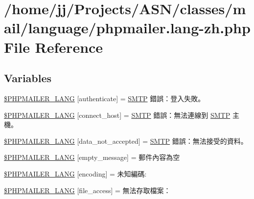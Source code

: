 \hypertarget{phpmailer_8lang-zh_8php}{}\section{/home/jj/\+Projects/\+A\+S\+N/classes/mail/language/phpmailer.lang-\/zh.php File Reference}
\label{phpmailer_8lang-zh_8php}
\subsection*{Variables}
\begin{DoxyCompactItemize}
\item 
\hyperlink{phpmailer_8lang-zh_8php_a2cb33073c989b85580748e331ed8b4aa}{\$\+P\+H\+P\+M\+A\+I\+L\+E\+R\+\_\+\+L\+A\+NG} \mbox{[}\textquotesingle{}authenticate\textquotesingle{}\mbox{]} = \textquotesingle{}\hyperlink{class_s_m_t_p}{S\+M\+TP} 錯誤：登入失敗。\textquotesingle{}
\item 
\hyperlink{phpmailer_8lang-zh_8php_a2ee0cc637a06b96e45600db31c6799ee}{\$\+P\+H\+P\+M\+A\+I\+L\+E\+R\+\_\+\+L\+A\+NG} \mbox{[}\textquotesingle{}connect\+\_\+host\textquotesingle{}\mbox{]} = \textquotesingle{}\hyperlink{class_s_m_t_p}{S\+M\+TP} 錯誤：無法連線到 \hyperlink{class_s_m_t_p}{S\+M\+TP} 主機。\textquotesingle{}
\item 
\hyperlink{phpmailer_8lang-zh_8php_a814c6b191205d2361b3233e9c9d6fda5}{\$\+P\+H\+P\+M\+A\+I\+L\+E\+R\+\_\+\+L\+A\+NG} \mbox{[}\textquotesingle{}data\+\_\+not\+\_\+accepted\textquotesingle{}\mbox{]} = \textquotesingle{}\hyperlink{class_s_m_t_p}{S\+M\+TP} 錯誤：無法接受的資料。\textquotesingle{}
\item 
\hyperlink{phpmailer_8lang-zh_8php_a33772099f637c9d6c2cd7425e0e37fed}{\$\+P\+H\+P\+M\+A\+I\+L\+E\+R\+\_\+\+L\+A\+NG} \mbox{[}\textquotesingle{}empty\+\_\+message\textquotesingle{}\mbox{]} = \textquotesingle{}郵件內容為空\textquotesingle{}
\item 
\hyperlink{phpmailer_8lang-zh_8php_a817f7283f3d54c970a0c10305cc668cc}{\$\+P\+H\+P\+M\+A\+I\+L\+E\+R\+\_\+\+L\+A\+NG} \mbox{[}\textquotesingle{}encoding\textquotesingle{}\mbox{]} = \textquotesingle{}未知編碼\+: \textquotesingle{}
\item 
\hyperlink{phpmailer_8lang-zh_8php_a7e83349023b856ef9e5c46e30ae6d51e}{\$\+P\+H\+P\+M\+A\+I\+L\+E\+R\+\_\+\+L\+A\+NG} \mbox{[}\textquotesingle{}file\+\_\+access\textquotesingle{}\mbox{]} = \textquotesingle{}無法存取檔案：\textquotesingle{}

\end{DoxyCompactItemize}
